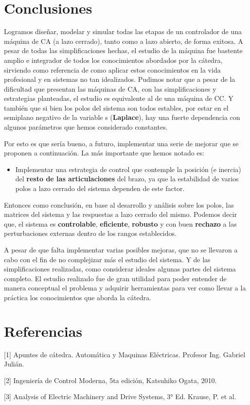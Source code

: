\documentclass[10pt]{article}
\begin{document}
\newpage
\section{Conclusiones}
Logramos diseñar, modelar y simular todas las etapas de un controlador de una máquina de CA (a lazo cerrado), tanto como a lazo abierto, de forma exitosa.
A pesar de todas las simplificaciones hechas, el estudio de la máquina fue bastente amplio e integrador de todos los conocimientos abordados por la cátedra, sirviendo como referencia de como aplicar estos conocimientos en la vida profesional y en sistemas no tan idealizados.
Pudimos notar que a pesar de la dificultad que presentan las máquinas de CA, con las simplificaciones y estrategias planteadas, el estudio es equivalente al de una máquina de CC.
Y también que si bien los polos del sistema son todos estables, por estar en el semiplano negativo de la variable s (\textbf{Laplace}), hay una fuerte dependencia con algunos parámetros que hemos considerado constantes.
\\
\par
Por esto es que sería bueno, a futuro, implementar una serie de mejorar que se proponen a continuación.
La más importante que hemos notado es:
\begin{itemize}
	\item Implementar una estrategia de control que contemple la posición (e inercia) del \textbf{resto de las articulaciones} del brazo, ya que la estabilidad de varios polos a lazo cerrado del sistema dependen de este factor.
\end{itemize}

Entonces como conclusión, en base al desarrollo y análisis sobre los polos, las matrices del sistema y las respuestas a lazo cerrado del mismo.
Podemos decir que, el sistema es \textbf{controlable}, \textbf{eficiente}, \textbf{robusto} y con buen \textbf{rechazo} a las perturbaciones externas dentro de los rangos establecidos.
\\
\par
A pesar de que falta implementar varias posibles mejoras, que no se llevaron a cabo con el fin de no complejizar más el estudio del sistema.
Y de las simplificaciones realizadas, como considerar ideales algunas partes del sistema completo.
El estudio realizado fue de gran utilidad para poder entender de manera conceptual el problema y adquirir herramientas para ver como llevar a la práctica los conocimientos que aborda la cátedra.

\section{Referencias}

[1] Apuntes de cátedra. Automática y Maquinas Eléctricas. Profesor Ing. Gabriel Julián.

[2] Ingeniería de Control Moderna, 5ta edición, Katsuhiko Ogata, 2010.

[3] Analysis of Electric Machinery and Drive Systems, 3° Ed. Krause, P. et al.
\end{document}
